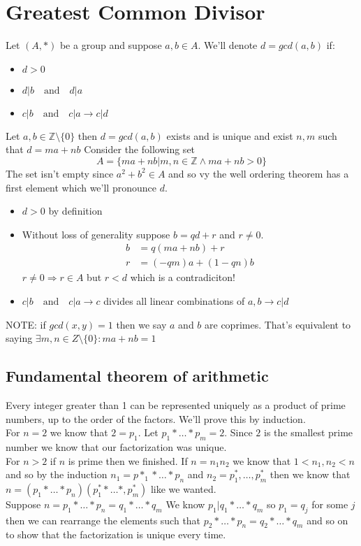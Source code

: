 \documentclass{article}
\newcommand{\Z}{\mathbb{Z}}
\begin{document}
	\newpage
	
	\section{Greatest Common Divisor}
	Let $(A,*)$ be a group and suppose $a,b\in A$. We'll denote $d = gcd(a,b)$ if:
	\begin{itemize}
		\item $d>0$
		\item $d|b \quad\mathrm{and}\quad d|a$
		\item $c|b \quad\mathrm{and}\quad c|a \rightarrow c|d$
	\end{itemize}
	Let $a,b\in \Z\setminus\{0\}$ then $d = gcd(a,b)$ exists and is unique and 
	exist $n,m$ such that $d=ma+nb$
	Consider the following set
	\[
		A = \{ma+nb|m,n\in\Z \land ma+nb>0\}
	\]
	The set isn't empty since $a^2+b^2\in A$ and so vy the well ordering theorem has a first element which we'll pronounce $d$.
	\begin{itemize}
		\item $d>0$ by definition
		\item Without loss of generality suppose $b=qd+r$ and $r\ne 0$.
		\begin{align*}
			b &= q(ma+nb)+r \\
			r &= (-qm)a + (1-qn)b
		\end{align*}
		$r\ne 0 \Rightarrow r\in A$ but $r<d$ which is a contradiciton! 
		\item $c|b \quad\mathrm{and}\quad c|a \rightarrow c$ divides all linear combinations of $a,b\rightarrow c|d$
	\end{itemize}
	NOTE: if $gcd(x,y) = 1$ then we say $a$ and $b$ are coprimes. That's equivalent to saying $\exists m,n\in Z\setminus\{0\}:ma+nb =  1$
	\subsection{Fundamental theorem of arithmetic}
	Every integer greater than 1 can be represented uniquely as a product of prime numbers, up to the order of the factors. We'll prove this by induction.\\
	For $n = 2$ we know that $2=p_1$. Let $p_1*\ldots*p_m=2$. Since $2$ is the smallest prime number we know that our factorization was unique.\\
	For $n > 2$ if $n$ is prime then we finished. If $n=n_1n_2$ we know that $1<n_1,n_2<n$ and so by the induction $n_1=p*_1*\ldots *p_n$ and $n_2=p^*_1,\ldots,p^*_m$ then we know that $n=(p_1*\ldots *p_n)(p^*_1*\ldots *,p^*_m)$ like we wanted.\\
	Suppose $n=p_1*\ldots *p_n=q_1*\ldots *q_m$ We know $p_1|q_1*\ldots *q_m$ so $p_1=q_j$ for some $j$ then we can rearrange the elements such that $p_2*\ldots *p_n = q_2*\ldots *q_m$ and so on to show that the factorization is unique every time.
\end{document}
